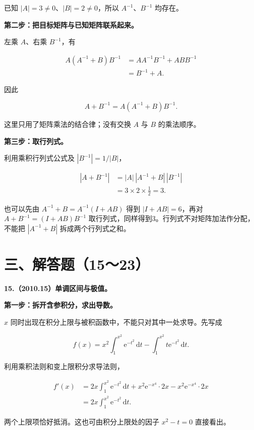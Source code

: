 \documentclass[UTF8,11pt,fontset=windows]{ctexart}
\begin{document}
已知 $|A|=3\ne0$、$|B|=2\ne0$，所以 $A^{-1}$、$B^{-1}$ 均存在。

\textbf{第二步：把目标矩阵与已知矩阵联系起来。}

左乘 $A$、右乘 $B^{-1}$，有

$$
\begin{aligned}
A(A^{-1}+B)B^{-1}
&=AA^{-1}B^{-1}+ABB^{-1}\\
&=B^{-1}+A.
\end{aligned}
$$

因此

$$
A+B^{-1}=A(A^{-1}+B)B^{-1}.
$$

这里只用了矩阵乘法的结合律；没有交换 $A$ 与 $B$ 的乘法顺序。

\textbf{第三步：取行列式。}

利用乘积行列式公式及 $|B^{-1}|=1/|B|$，

$$
\begin{aligned}
|A+B^{-1}|
&=|A|\,|A^{-1}+B|\,|B^{-1}|\\
&=3\times2\times\frac12
=\boxed3.
\end{aligned}
$$

也可以先由 $A^{-1}+B=A^{-1}(I+AB)$ 得到 $|I+AB|=6$，再对 $A+B^{-1}=(I+AB)B^{-1}$ 取行列式，同样得到3。行列式不对矩阵加法作分配，不能把 $|A^{-1}+B|$ 拆成两个行列式之和。

\clearpage

\section*{三、解答题（15～23）}

\textbf{15.（2010.15）单调区间与极值。}

\textbf{第一步：拆开含参积分，求出导数。}

$x$ 同时出现在积分上限与被积函数中，不能只对其中一处求导。先写成

$$
f(x)=x^2\int_1^{x^2}\mathrm e^{-t^2}\,\mathrm dt
-\int_1^{x^2}t\mathrm e^{-t^2}\,\mathrm dt.
$$

利用乘积法则和变上限积分求导法则，

$$
\begin{aligned}
f'(x)
&=2x\int_1^{x^2}\mathrm e^{-t^2}\,\mathrm dt
+x^2\mathrm e^{-x^4}\cdot2x
-x^2\mathrm e^{-x^4}\cdot2x\\
&=2x\int_1^{x^2}\mathrm e^{-t^2}\,\mathrm dt.
\end{aligned}
$$

两个上限项恰好抵消。这也可由积分上限处的因子 $x^2-t=0$ 直接看出。
\end{document}
